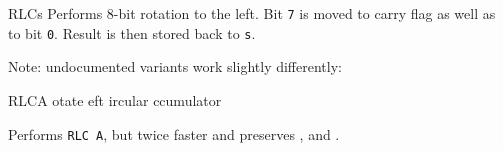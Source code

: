 \begin{basedescript}{
	\desclabelstyle{\multilinelabel}
	\desclabelwidth{3cm}}
\begin{DetailItem}{RLC}{s}
		Performs 8-bit rotation to the left. Bit {\tt 7} is moved to carry flag \FlagCF{} as well as to bit {\tt 0}. Result is then stored back to {\tt s}.

		Note: undocumented variants work slightly differently:

		\begin{multicols}{2}

		\end{multicols}

		\begin{DetailEffects}[p]
			\FlagsRLCr
		\end{DetailEffects}

		\begin{DetailEffectsFlags}
			\DetailFlagSF{\DetailFlagResultSign}
			\DetailFlagZF{\DetailFlagResultZero}
			\DetailFlagPV{\DetailFlagResultParity}
		\end{DetailEffectsFlags}

		\begin{DetailTiming}
		\end{DetailTiming}

	\end{DetailItem}

	\pagebreak


	\begin{DetailItem}{RLCA}{}
		{otate eft ircular ccumulator}
		{}
		
		Performs {\tt RLC A}, but twice faster and preserves \FlagSF{}, \FlagZF{} and \FlagPV{}.

		\begin{DetailEffects}
			\FlagsRLCA
		\end{DetailEffects}


\end{DetailItem}
\end{basedescript}
